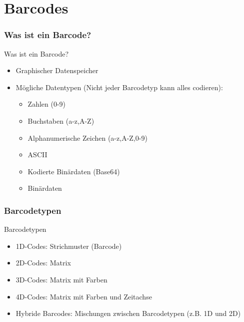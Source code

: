 \part{Barcodes}


\section{Was ist ein Barcode?}
\begin{frame}[<+->]{Was ist ein Barcode?}
	\begin{itemize}
	\pause
	\item Graphischer Datenspeicher
	\item Mögliche Datentypen (Nicht jeder Barcodetyp kann alles codieren):
		\begin{itemize}
		\item Zahlen (0-9)
		\item Buchstaben (a-z,A-Z)
		\item Alphanumerische Zeichen (a-z,A-Z,0-9)
		\item ASCII
		\item Kodierte Binärdaten (Base64)
		\item Binärdaten
		\end{itemize}
	\end{itemize}
\end{frame}

\section{Barcodetypen}

\begin{frame}[<+->]{Barcodetypen}
	\begin{itemize}
	\item 1D-Codes: Strichmuster (Barcode)
	\item 2D-Codes: Matrix
	\item 3D-Codes: Matrix mit Farben
	\item 4D-Codes: Matrix mit Farben und Zeitachse
	\item Hybride Barcodes: Mischungen zwischen Barcodetypen (z.B. 1D und 2D)
	\end{itemize}
\end{frame}

